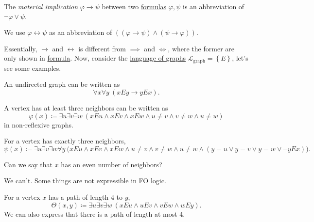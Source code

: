 \begin{notation}
	The \emph{material implication} \(\varphi \to \psi \) between two \hyperref[def:formula]{formulas} \(\varphi, \psi \) is an abbreviation of \(\lnot \varphi \lor \psi\).
\end{notation}

\begin{notation}
	We use \(\varphi \leftrightarrow \psi \) as an abbreviation of \(((\varphi \to \psi ) \land (\psi \to \varphi ))\).
\end{notation}

Essentially, \(\to \) and \(\leftrightarrow\) is different from \(\implies \) and \(\iff \), where the former are only shown in \hyperref[def:formula]{formula}. Now, consider the \hyperref[eg:language-graph]{language of graphs} \(\mathcal{L} _{\text{graph} } = \left\{ E\right\} \), let's see some examples.
\begin{eg}
	An undirected graph can be written as
	\[
		\forall x\forall y\ (xEy \to yEx).
	\]
\end{eg}

\begin{eg}
	A vertex has at least three neighbors can be written as
	\[
		\varphi (x) \coloneqq \exists u\exists v\exists w\ (xEu \land xEv \land xEw \land u \neq v\land v \neq w\land u \neq w)
	\]
	in non-reflexive graphs.
\end{eg}

\begin{eg}
	For a vertex has exactly three neighbors,
	\[
		\psi (x)\coloneqq \exists u \exists v \exists w \forall y\ \big(xEu \land xEv \land xEw \land u \neq v\land v \neq w\land u \neq w \land (y = u \lor y = v \lor y = w \lor \lnot y E x)\big).
	\]
\end{eg}

\begin{problem*}
	Can we say that \(x\) has an even number of neighbors?
\end{problem*}
\begin{answer}
	We can't. Some things are not expressible in FO logic.
\end{answer}

\begin{eg}
	For a vertex \(x\) has a path of length \(4\) to \(y\),
	\[
		\Theta (x, y) \coloneqq \exists u \exists v \exists w\ (xEu \land uEv \land vEw \land wEy).
	\]
	We can also express that there is a path of length at most \(4\).
\end{eg}

